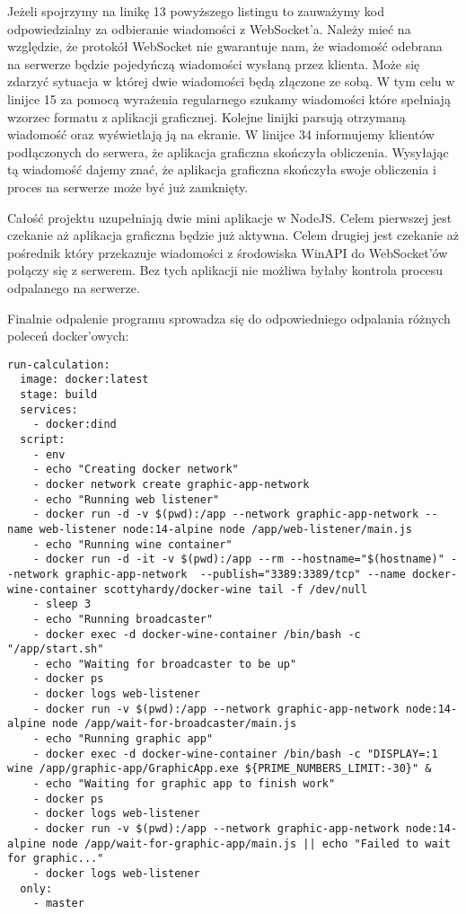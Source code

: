Jeżeli spojrzymy na linikę 13 powyższego listingu to zauważymy kod odpowiedzialny za odbieranie wiadomości z WebSocket'a. Należy mieć na względzie, że protokół WebSocket nie gwarantuje nam, że wiadomość odebrana na serwerze będzie pojedyńczą wiadomości wysłaną przez klienta. Może się zdarzyć sytuacja w której dwie wiadomości będą złączone ze sobą. W tym celu w linijce 15 za pomocą wyrażenia regularnego szukamy wiadomości które spełniają wzorzec formatu z aplikacji graficznej. Kolejne linijki parsują otrzymaną wiadomość oraz wyświetlają ją na ekranie. W linijce 34 informujemy klientów podłączonych do serwera, że aplikacja graficzna skończyła obliczenia. Wysyłając tą wiadomość dajemy znać, że aplikacja graficzna skończyła swoje obliczenia i proces na serwerze może być już zamknięty.
\par
Całość projektu uzupełniają dwie mini aplikacje w NodeJS. Celem pierwszej jest czekanie aż aplikacja graficzna będzie już aktywna. Celem drugiej jest czekanie aż pośrednik który przekazuje wiadomości z środowiska WinAPI do WebSocket'ów połączy się z serwerem. Bez tych aplikacji nie możliwa byłaby kontrola procesu odpalanego na serwerze.
\par
Finalnie odpalenie programu sprowadza się do odpowiedniego odpalania różnych poleceń docker'owych:
\begin{lstlisting}[caption={.gitlab-ci.yml - konfiguracji procesu automatyzującego}]
run-calculation:
  image: docker:latest
  stage: build
  services:
    - docker:dind
  script:
    - env
    - echo "Creating docker network"
    - docker network create graphic-app-network
    - echo "Running web listener"
    - docker run -d -v $(pwd):/app --network graphic-app-network --name web-listener node:14-alpine node /app/web-listener/main.js
    - echo "Running wine container"
    - docker run -d -it -v $(pwd):/app --rm --hostname="$(hostname)" --network graphic-app-network  --publish="3389:3389/tcp" --name docker-wine-container scottyhardy/docker-wine tail -f /dev/null
    - sleep 3
    - echo "Running broadcaster"
    - docker exec -d docker-wine-container /bin/bash -c "/app/start.sh"
    - echo "Waiting for broadcaster to be up"
    - docker ps
    - docker logs web-listener
    - docker run -v $(pwd):/app --network graphic-app-network node:14-alpine node /app/wait-for-broadcaster/main.js
    - echo "Running graphic app"
    - docker exec -d docker-wine-container /bin/bash -c "DISPLAY=:1 wine /app/graphic-app/GraphicApp.exe ${PRIME_NUMBERS_LIMIT:-30}" &
    - echo "Waiting for graphic app to finish work"
    - docker ps
    - docker logs web-listener
    - docker run -v $(pwd):/app --network graphic-app-network node:14-alpine node /app/wait-for-graphic-app/main.js || echo "Failed to wait for graphic..."
    - docker logs web-listener
  only:
    - master
\end{lstlisting}
